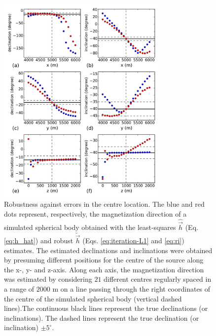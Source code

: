 \documentclass[journal abbreviation, npg]{copernicus}
\begin{document}
\begin{figure}[t]
\vspace*{2mm}
\begin{center}
\includegraphics[width=8.3cm]{Figures/Fig8.pdf}
\end{center}
\caption{Robustness against errors in the centre location. The blue and red dots represent, respectively, the magnetization direction of a simulated spherical body obtained with the least-squares $\hat{\vec{h}}$ (Eq. \ref{eq:h_hat}) and robust $\tilde{\vec{h}}$ (Eqs. \ref{eq:iteration-L1} and \ref{eq:ri}) estimates. The estimated declinations and inclinations were obtained by presuming different positions for the centre of the source along the x-, y- and z-axis. Along each axis, the magnetization direction was estimated by considering $21$ different centres regularly spaced in a range of $2000$ m on a line passing through the right coordinates of the centre of the simulated spherical body (vertical dashed lines).The continuous black lines represent the true declinations (or inclinations). The dashed lines represent the true declination (or inclination) $\pm 5^{\circ}$.}
\label{fig:robust-center-results}
\end{figure}
\end{document}
